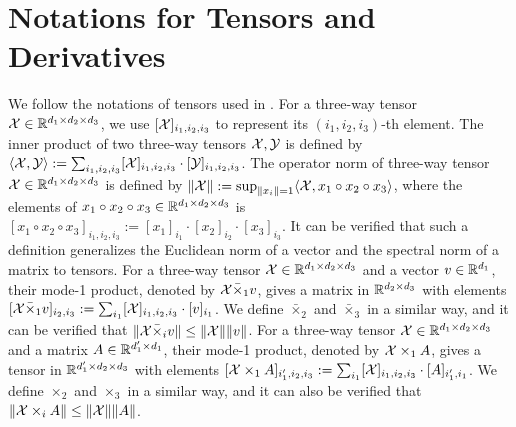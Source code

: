 
\newpage

\section{Notations for Tensors and Derivatives} \label{apx:tensor}
We follow the notations of tensors used in \cite{kolda2009tensor}.
For a three-way tensor ${\mathcal{X}} \in {\mathbb{R}}^{d_1 \times d_2 \times d_3}$,
we use $ [{\mathcal{X}}]_{i_1,i_2,i_3}$ to represent its $(i_1,i_2,i_3)$-th element.
The inner product of two three-way tensors ${\mathcal{X}},{\mathcal{Y}}$ is defined by $\langle {\mathcal{X}}, {\mathcal{Y}} \rangle := \sum_{i_1,i_2,i_3} [{\mathcal{X}}]_{i_1,i_2,i_3} \cdot [{\mathcal{Y}}]_{i_1,i_2,i_3}$. The operator norm of three-way tensor ${\mathcal{X}} \in {\mathbb{R}}^{d_1 \times d_2 \times d_3}$ is defined by $\Vert {\mathcal{X}} \Vert:= \sup_{\Vert x_i \Vert =1} \langle {\mathcal{X}}, x_1 \circ x_2 \circ x_3 \rangle $, where the elements of  $x_1 \circ x_2 \circ x_3 \in {\mathbb{R}}^{d_1 \times d_2 \times d_3}$ is $ [x_1 \circ x_2 \circ x_3]_{i_1,i_2,i_3} := [x_1]_{i_1} \cdot  [x_2]_{i_2} \cdot [x_3]_{i_3} $. 
It can be verified that such a definition generalizes the Euclidean norm of a vector and the spectral norm of a matrix to tensors.
For a three-way tensor  $ {\mathcal{X}} \in {\mathbb{R}}^{d_1 \times d_2 \times d_3}$ and a vector $v \in {\mathbb{R}}^{d_1}$, their mode-1 product, denoted by ${\mathcal{X}} \bar \times_1 v$, gives a matrix in ${\mathbb{R}}^{d_2 \times d_3}$ with elements $ [{\mathcal{X}} \bar \times_1 v]_{i_2,i_3} := \sum_{i_1} [{\mathcal{X}}]_{i_1,i_2,i_3} \cdot [v]_{i_1} $.
We define $\bar \times_2$ and $\bar \times_3$ in a similar way, and it can  be verified that 
$ \Vert {\mathcal{X}} \bar \times_i v \Vert \le \Vert {\mathcal{X}} \Vert \Vert v \Vert$.
For a three-way tensor ${\mathcal{X}} \in {\mathbb{R}}^{d_1 \times d_2 \times d_3}$ and a matrix $A \in {\mathbb{R}}^{d_1' \times d_1}$, their mode-1 product, denoted by $ {\mathcal{X}} \times_1 A$, gives a tensor in ${\mathbb{R}}^{d_1' \times d_2 \times d_3}$ with elements  $ [{\mathcal{X}} \times_1 A]_{i_1',i_2,i_3} := \sum_{i_1} [{\mathcal{X}}]_{i_1,i_2,i_3} \cdot [A]_{i_1',i_1} $. We define $ \times_2$ and $ \times_3$ in a similar way, and it can also be verified that 
$ \Vert {\mathcal{X}} \times_i A \Vert \le \Vert {\mathcal{X}} \Vert \Vert A \Vert$.

